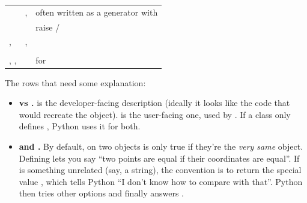 \documentclass[10pt,a4paper]{article}
\begin{document}
\begin{datatable}{}{\footnotesize}
\begin{xltabular}{\linewidth}{@{}Y{0.80}Y{0.78}Y{1.42}@{}}
 & ,  & often written as a generator with  \\
 &  & raise  /  \\
,  & ,  &  \\
 &  &  \\
, ,  & \code{+\ -\ *} &  for  \\
\hline
\end{xltabular}
\end{datatable}
The rows that need some explanation:
\begin{itemize}
\item \textbf{ vs .}  is the developer-facing description (ideally it looks like the code that would recreate the object).  is the user-facing one, used by . If a class only defines , Python uses it for both.
\end{itemize}
\begin{itemize}
\item \textbf{ and .} By default,  on two objects is only true if they’re the \emph{very same} object. Defining  lets you say “two points are equal if their coordinates are equal”. If  is something unrelated (say, a string), the convention is to return the special value , which tells Python “I don’t know how to compare with that”. Python then tries other options and finally answers .
\end{itemize}
\end{document}
